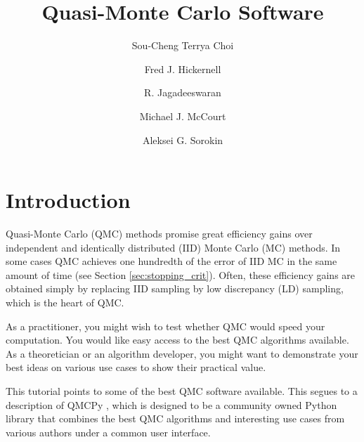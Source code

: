 \documentclass[graybox,footinfo]{svmult}
\begin{document}
\title*{Quasi-Monte Carlo Software}
\author{Sou-Cheng Terrya Choi \and Fred J. Hickernell \and R. Jagadeeswaran \and Michael J. McCourt \and Aleksei G. Sorokin}

\maketitle



\section{Introduction} \label{sec:intro}
Quasi-Monte Carlo (QMC) methods promise great efficiency gains over independent and identically distributed (IID) Monte Carlo (MC) methods.  In some cases QMC  achieves one hundredth of the error of IID MC in the same amount of time (see Section \ref{sec:stopping_crit}). Often, these efficiency gains are obtained simply by  replacing IID sampling by low discrepancy (LD) sampling, which is the heart of QMC. 

As a practitioner, you might wish to test whether QMC would speed your computation.  You would like easy access to the best QMC algorithms available.  As a theoretician or an algorithm developer, you might want to demonstrate your best ideas on  various  use cases to show their practical value.  

This tutorial points to some of the best QMC software available.  This segues to a description of  QMCPy \cite{QMCPy2020a}, which is designed to be a community owned Python library that combines the best QMC algorithms and interesting use cases from various authors under a common user interface.
\end{document}
